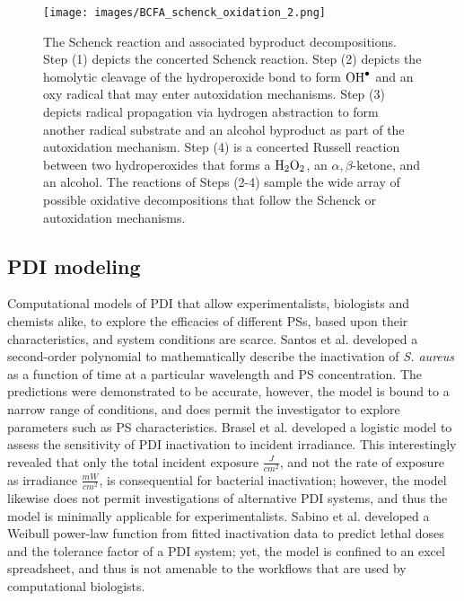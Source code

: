 \begin{figure}[t]
    \centering
    \texttt{[image: images/BCFA\_schenck\_oxidation\_2.png]}
    \caption{
         The Schenck reaction and associated byproduct decompositions. Step (1) depicts the concerted\cite{Foote1968PhotosensitizedOxygen} Schenck reaction. Step (2) depicts the homolytic cleavage of the hydroperoxide bond to form $\ce{OH^.}$ and an oxy radical that may enter autoxidation mechanisms. Step (3) depicts radical propagation via hydrogen abstraction to form another radical substrate and an alcohol byproduct as part of the autoxidation mechanism. Step (4) is a concerted Russell reaction\cite{Russell1957Deuterium-isotopeRadicals,Howard1968TheMechanism} between two hydroperoxides that forms a $\ce{H2O2}$, an $\alpha,\beta$-ketone, and an alcohol. The reactions of Steps (2-4) sample the wide array of possible oxidative decompositions that follow the Schenck or autoxidation mechanisms.
    }
    \label{schenck_mechanism}
\end{figure}

\subsection*{PDI modeling}
Computational models of PDI that allow experimentalists, biologists and chemists alike, to explore the efficacies of different PSs, based upon their characteristics, and system conditions are scarce. Santos et al. \cite{Santos2020ApplicationAureus} developed a second-order polynomial to mathematically describe the inactivation of \textit{S. aureus} as a function of time at a particular wavelength and PS concentration. The predictions were demonstrated to be accurate, however, the model is bound to a narrow range of conditions, and does permit the investigator to explore parameters such as PS characteristics. Brasel et al. \cite{Brasel2020AnAgalactiae} developed a logistic model to assess the sensitivity of PDI inactivation to incident irradiance. This interestingly revealed that only the total incident exposure $\frac{J}{cm^2}$, and not the rate of exposure as irradiance $\frac{mW}{cm^2}$, is consequential for bacterial inactivation; however, the model likewise does not permit investigations of alternative PDI systems, and thus the model is minimally applicable for experimentalists. Sabino et al. \cite{Sabino2019InactivationTherapy} developed a Weibull power-law function from fitted inactivation data to predict lethal doses and the tolerance factor of a PDI system; yet, the model is confined to an excel spreadsheet, and thus is not amenable to the workflows that are used by computational biologists. 

